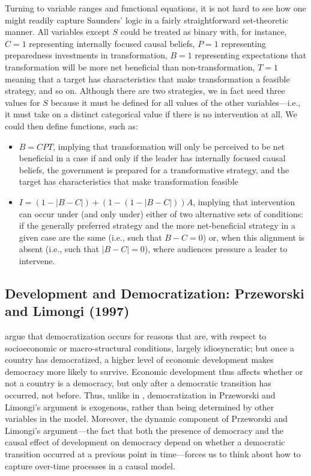 \documentclass[12pt,]{book}
\providecommand{\tightlist}{%
  \setlength{\itemsep}{0pt}\setlength{\parskip}{0pt}}
\begin{document}
Turning to variable ranges and functional equations, it is not hard to see how one might readily capture Saunders' logic in a fairly straightforward set-theoretic manner. All variables except \(S\) could be treated as binary with, for instance, \(C=1\) representing internally focused causal beliefs, \(P=1\) representing preparedness investments in transformation, \(B=1\) representing expectations that transformation will be more net beneficial than non-transformation, \(T=1\) meaning that a target has characteristics that make transformation a feasible strategy, and so on. Although there are two strategies, we in fact need three values for \(S\) because it must be defined for all values of the other variables---i.e., it must take on a distinct categorical value if there is no intervention at all. We could then define functions, such as:

\begin{itemize}
\tightlist
\item
  \(B=CPT\), implying that transformation will only be perceived to be net beneficial in a case if and only if the leader has internally focused causal beliefs, the government is prepared for a transformative strategy, and the target has characteristics that make transformation feasible
\item
  \(I=(1-|B-C|)+(1-(1-|B-C|))A\), implying that intervention can occur under (and only under) either of two alternative sets of conditions: if the generally preferred strategy and the more net-beneficial strategy in a given case are the same (i.e., such that \(B-C=0\)) or, when this alignment is absent (i.e., such that \(|B-C|=0\)), where audiences pressure a leader to intervene.
\end{itemize}

\hypertarget{development-and-democratization-przeworski-and-limongi-1997}{%
\subsection{Development and Democratization: Przeworski and Limongi (1997)}\label{development-and-democratization-przeworski-and-limongi-1997}}

\citet{przeworski1997modernization} argue that democratization occurs for reasons that are, with respect to socioeconomic or macro-structural conditions, largely idiosyncratic; but once a country has democratized, a higher level of economic development makes democracy more likely to survive. Economic development thus affects whether or not a country is a democracy, but only after a democratic transition has occurred, not before. Thus, unlike in \citet{boix2003democracy}, democratization in Przeworski and Limongi's argument is exogenous, rather than being determined by other variables in the model. Moreover, the dynamic component of Przeworski and Limongi's argument---the fact that both the presence of democracy and the causal effect of development on democracy depend on whether a democratic transition occurred at a previous point in time---forces us to think about how to capture over-time processes in a causal model.
\end{document}
